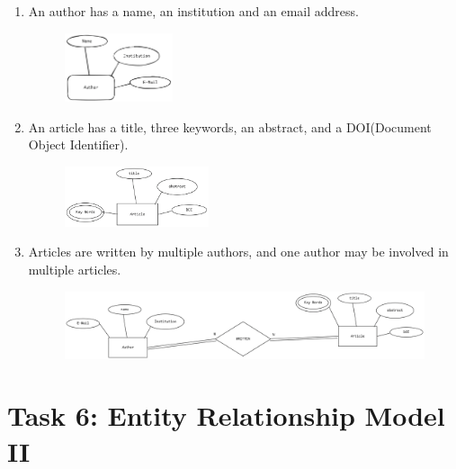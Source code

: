 \documentclass{article}
\begin{document}
\begin{enumerate}
\item An author has a name, an institution and an email address.

\begin{figure}[h]
\centering
\includegraphics[width=0.3\textwidth]{5.1.png}
\end{figure}

\item An article has a title, three keywords, an abstract, and a DOI(Document Object Identifier).
\begin{figure}[h]
\centering
\includegraphics[width=0.4\textwidth]{5.2.png}
\end{figure}

\item Articles are written by multiple authors, and one author may be involved in multiple articles.
\begin{figure}[h]
\centering
\includegraphics[width=1\textwidth]{5.3.png}
\end{figure}
\end{enumerate}


\newpage

\section*{Task 6: Entity Relationship Model II}
\end{document}
